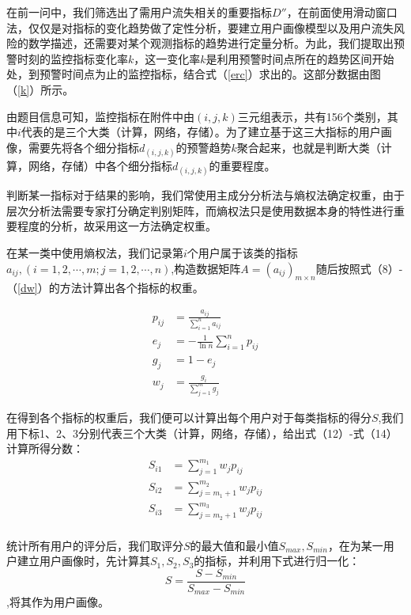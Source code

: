 \documentclass{my_paper}
\begin{document}
在前一问中，我们筛选出了需用户流失相关的重要指标$D''$，在前面使用滑动窗口法，仅仅是对指标的变化趋势做了定性分析，要建立用户画像模型以及用户流失风险的数学描述，还需要对某个观测指标的趋势进行定量分析。为此，我们提取出预警时刻的监控指标变化率$k$，这一变化率$k$是利用预警时间点所在的趋势区间开始处，到预警时间点为止的监控指标，结合式（\ref{erc}）求出的。这部分数据由图（\ref{k}）所示。

由题目信息可知，监控指标在附件中由$(i,j,k)$三元组表示，共有156个类别，其中$i$代表的是三个大类（计算，网络，存储）。为了建立基于这三大指标的用户画像，需要先将各个细分指标$d_{(i,j,k)}$的预警趋势$k$聚合起来，也就是判断大类（计算，网络，存储）中各个细分指标$d_{(i,j,k)}$的重要程度。

判断某一指标对于结果的影响，我们常使用主成分分析法\cite{4}与熵权法\cite{5}确定权重，由于层次分析法需要专家打分确定判别矩阵，而熵权法只是使用数据本身的特性进行重要程度的分析，故采用这一方法确定权重。

在某一类中使用熵权法，我们记录第$i$个用户属于该类的指标$a_{ij},(i=1,2,\cdots,m;j=1,2,\cdots,n)$,构造数据矩阵$A=(a_{ij})_{m\times n}$随后按照式（8）-（\ref{dw}）的方法计算出各个指标的权重。

\begin{align}
    p_{ij} &= \frac{a_{ij}}{\sum^n_{i=1}a_{ij}}\\
    e_j &= -\frac{1}{\ln n}\sum^n_{i=1}p_{ij}\\
    g_j &= 1-e_j\\
    w_j &= \frac{g_i}{\sum^m_{j=1}g_j}
    \label{dw}
\end{align}

在得到各个指标的权重后，我们便可以计算出每个用户对于每类指标的得分$S$,我们用下标1、2、3分别代表三个大类（计算，网络，存储），给出式（12）-式（14）计算所得分数：
\begin{align}
    S_{i1} &= \sum^{m_1}_{j=1} w_j p_{ij}\\ 
    S_{i2} &= \sum^{m_2}_{j=m_1+1} w_j p_{ij}\\
    S_{i3} &= \sum^{m_3}_{j=m_2+1} w_j p_{ij}\\
\end{align}

统计所有用户的评分后，我们取评分$S$的最大值和最小值$S_{max},S_{min}$，在为某一用户建立用户画像时，先计算其$S_1,S_2,S_3$的指标，并利用下式进行归一化：
\begin{equation}
S = \frac{S-S_{min}}{S_{max}-S_{min}}
\label{}
\end{equation}
,将其作为用户画像。
\end{document}
